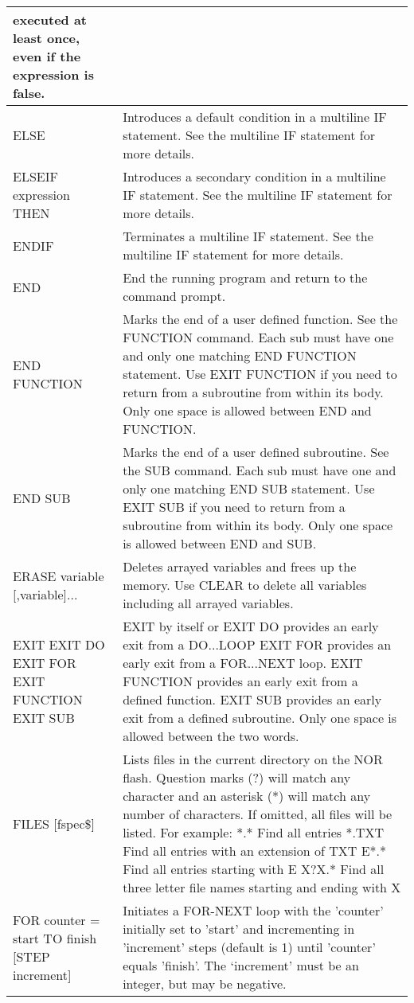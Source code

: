 \documentclass[11pt,fleqn]{book} %
\numberwithin{equation}{section} %
\numberwithin{figure}{section} %
\numberwithin{table}{section} %
\begin{document}
\begin{table}[]
\begin{tabular}{|p{4cm}|p{10cm}|}
executed at least once, even if the expression is false.
\\ \hline
ELSE & Introduces a default condition in a multiline IF statement.
See the multiline IF statement for more details.
\\ \hline
ELSEIF expression THEN & Introduces a secondary condition in a multiline IF statement.
See the multiline IF statement for more details.
\\ \hline
ENDIF & Terminates a multiline IF statement.
See the multiline IF statement for more details.
\\ \hline
END & End the running program and return to the command prompt.
\\ \hline
END FUNCTION & Marks the end of a user defined function. See the FUNCTION
command.
Each sub must have one and only one matching END FUNCTION
statement. Use EXIT FUNCTION if you need to return from a
subroutine from within its body.
Only one space is allowed between END and FUNCTION.
\\ \hline
END SUB & Marks the end of a user defined subroutine. See the SUB command.
Each sub must have one and only one matching END SUB statement.
Use EXIT SUB if you need to return from a subroutine from within its
body.
Only one space is allowed between END and SUB.
\\ \hline
ERASE variable
[,variable]...
&
Deletes arrayed variables and frees up the memory.
Use CLEAR to delete all variables including all arrayed variables.
\\ \hline
EXIT
EXIT DO
EXIT FOR
EXIT FUNCTION
EXIT SUB
 & EXIT by itself or EXIT DO provides an early exit from a DO...LOOP
EXIT FOR provides an early exit from a FOR...NEXT loop.
EXIT FUNCTION provides an early exit from a defined function.
EXIT SUB provides an early exit from a defined subroutine.
Only one space is allowed between the two words.
\\ \hline
FILES [fspec\$] & Lists files in the current directory on the NOR flash.
Question marks
(?) will match any character and an asterisk (*) will match any number
of characters. If omitted, all files will be listed. For example:
*.*
Find all entries
*.TXT
Find all entries with an extension of TXT
E*.*
Find all entries starting with E
X?X.*
Find all three letter file names starting and ending with
X
\\ \hline
FOR counter = start TO
finish [STEP increment]
& Initiates a FOR-NEXT loop with the 'counter' initially set to 'start' and
incrementing in 'increment' steps (default is 1) until 'counter' equals
'finish'. The ‘increment’ must be an integer, but may be negative.

\end{tabular}
\end{table}
\end{document}
